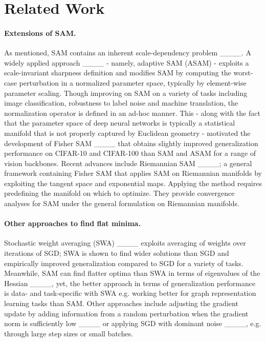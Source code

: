 \section{Related Work}
\paragraph{Extensions of SAM.} As mentioned, SAM contains an inherent scale-dependency problem ____. A widely applied approach ____ - namely, adaptive SAM (ASAM) - exploits a scale-invariant sharpness definition and modifies SAM by computing the worst-case perturbation in a normalized parameter space, typically by element-wise parameter scaling. Though improving on SAM on a variety of tasks including image classification, robustness to label noise and machine translation, the normalization operator is defined in an ad-hoc manner. This - along with the fact that the parameter space of deep neural networks is typically a statistical manifold that is not properly captured by Euclidean geometry - motivated the development of Fisher SAM ____ that obtains slightly improved generalization performance on CIFAR-10 and CIFAR-100 than SAM and ASAM for a range of vision backbones. Recent advances include Riemannian SAM ____; a general framework containing Fisher SAM that applies SAM on Riemannian manifolds by exploiting the tangent space and exponential maps. Applying the method requires predefining the manifold on which to optimize. They provide convergence analyses for SAM under the general formulation on Riemannian manifolds.



\paragraph{Other approaches to find flat minima.} 
Stochastic weight averaging (SWA) ____ exploits averaging of weights over iterations of SGD; SWA is shown to find wider solutions than SGD and empirically improved generalization compared to SGD for a variety of tasks. Meanwhile, SAM can find flatter optima than SWA in terms of eigenvalues of the Hessian ____, yet, the better approach in terms of generalization performance is data- and task-specific with SWA e.g. working better for graph representation learning tasks than SAM. Other approaches include adjusting the gradient update by adding information from a random perturbation when the gradient norm is sufficiently low ____ or applying SGD with dominant noise ____, e.g. through large step sizes or small batches.


